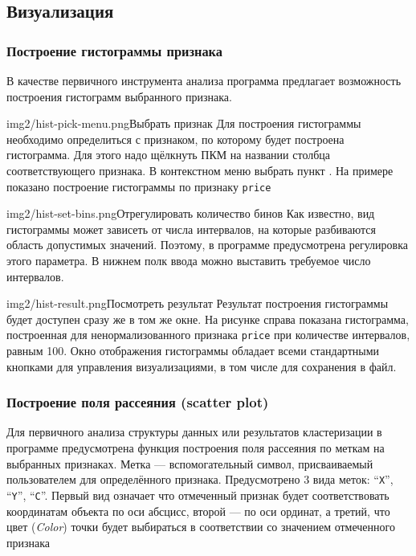\documentclass[12pt,tikz]{instruction}
\begin{document}
\newpage
\subsection{Визуализация}
\subsubsection{Построение гистограммы признака}
\label{subsubsec:hist}

В качестве первичного инструмента анализа программа предлагает возможность построения гистограмм выбранного признака.

\begin{steps}
	\begin{ist}{img2/hist-pick-menu.png}{Выбрать признак}
		Для построения гистограммы необходимо определиться с признаком, по которому будет построена гистограмма. Для этого надо щёлкнуть ПКМ на названии столбца соответствующего признака. В контекстном меню выбрать пункт . На примере показано построение гистограммы по признаку \texttt{price}
	\end{ist}
	\begin{ist}{img2/hist-set-bins.png}{Отрегулировать количество бинов}
		Как известно, вид гистограммы может зависеть от числа интервалов, на которые разбиваются область допустимых значений. Поэтому, в программе предусмотрена регулировка этого параметра. В нижнем полк ввода можно выставить требуемое число интервалов.
	\end{ist}
	\begin{ist}{img2/hist-result.png}{Посмотреть результат}
		Результат построения гистограммы будет доступен сразу же в том же окне. На рисунке справа показана гистограмма, построенная для ненормализованного признака \texttt{price} при количестве интервалов, равным 100. Окно отображения гистограммы обладает всеми стандартными кнопками для управления визуализациями, в том числе для сохранения в файл.
	\end{ist}		
\end{steps}	


\newpage
\subsubsection{Построение поля рассеяния (scatter plot)}
\label{subsubsec:scatterplot}

Для первичного анализа структуры данных или результатов кластеризации в программе предусмотрена функция построения поля рассеяния по меткам на выбранных признаках. Метка --- вспомогательный символ, присваиваемый пользователем для  определённого признака.  Предусмотрено 3 вида меток: ``\texttt{X}'', ``\texttt{Y}'', ``\texttt{C}''. Первый вид означает что отмеченный признак будет соответствовать координатам объекта по оси абсцисс, второй --- по оси ординат, а третий, что цвет (\textit{Color}) точки будет выбираться в соответствии со значением отмеченного признака
\end{document}
